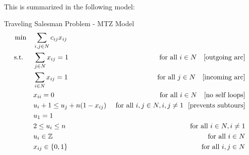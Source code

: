 This is summarized in the following model:
\begin{general}{Traveling Salesman Problem - MTZ Model}{}
\begin{align*}
\min \quad & \sum_{i,j \in N} c_{ij} x_{ij}\\
\st \quad  & \sum_{j\in N} x_{ij} = 1 & \text{ for all } i \in N \ \ \text{ [outgoing arc]}\\
& \sum_{i \in N} x_{ij} = 1 & \text{ for all } j \in N \ \ \text{ [incoming arc]}\\
& x_{ii} = 0 & \text{ for all } i \in N \ \ \text{ [no self loops]} \\
& u_i + 1 \leq u_j + n(1-x_{ij})  & \text{ for all } i,j \in N, i,j \neq 1 \ \ \text{[prevents subtours]}\\
& u_1 = 1\\
& 2 \leq u_i \leq n & \text{ for all } i \in N, i \neq 1\\
& u_i \in \Z & \text{ for all } i \in N\\
& x_{ij} \in \{0,1\} & \text{ for all } i,j \in N
\end{align*}
\end{general}

